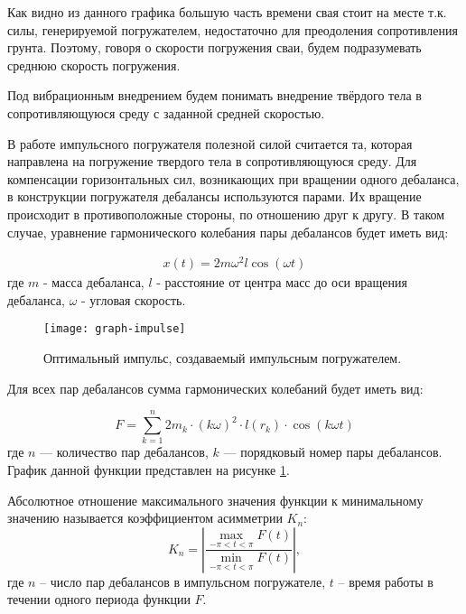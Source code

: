 \noindent Как видно из данного графика большую часть времени свая стоит на месте т.к. силы, генерируемой погружателем,
недостаточно для преодоления сопротивления грунта. Поэтому, говоря о скорости погружения сваи, будем подразумевать среднюю
скорость погружения.

\begin{definition}
    Под вибрационным внедрением будем понимать внедрение твёрдого тела в сопротивляющуюся среду с заданной
    средней скоростью.
\end{definition}

В работе импульсного погружателя полезной силой считается та, которая направлена на погружение твердого тела в
сопротивляющуюся среду. Для компенсации горизонтальных сил, возникающих при вращении одного дебаланса,
в конструкции погружателя дебалансы используются парами. Их вращение происходит в противоположные стороны, по отношению друг
к другу. В таком случае, уравнение гармонического колебания пары дебалансов будет иметь вид:

\begin{equation}
    \begin{aligned}
        x(t) = 2 m \omega^2 l \cos (\omega t)
    \end{aligned}
\end{equation}
\noindent где $m$ - масса дебаланса, $l$ - расстояние от центра масс до оси вращения дебаланса, $\omega$ - угловая скорость.

\begin{figure}[ht]
    \centering
    \texttt{[image: graph-impulse]}
    \caption{Оптимальный импульс, создаваемый импульсным погружателем.}
    \label{fig:graph-impulse}
\end{figure}

\noindent Для всех пар дебалансов сумма гармонических колебаний будет иметь вид:

\begin{equation}
    \label{eq:F}
    F = \sum\limits_{k = 1}^n 2 m_k \cdot (k \omega)^2 \cdot l(r_k) \cdot \cos (k \omega t)
\end{equation}
\noindent где $n$ --- количество пар дебалансов, $k$ --- порядковый номер пары дебалансов. График данной функции
представлен на рисунке \ref{fig:graph-impulse}.

Абсолютное отношение максимального значения функции к минимальному значению называется коэффициентом асимметрии $K_n$:
\begin{equation}
    \label{eq:asymm-coef}
    K_n = \left| \frac{ \max\limits_{-\pi<t<\pi} F(t)}{\min\limits_{-\pi<t<\pi} F(t)}\right|,
\end{equation}
где $n$ -- число пар дебалансов в импульсном погружателе, $t$ -- время работы в течении одного периода функции $F$.

